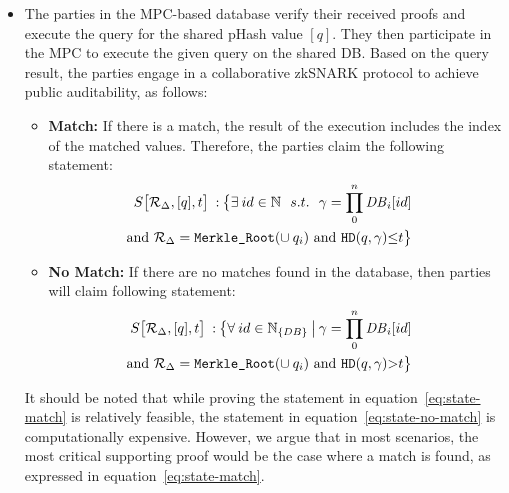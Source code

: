 {\begin{itemize}
    \item[]  The parties in the MPC-based database verify their received proofs and execute the query for the shared pHash value $[q]$. They then participate in the MPC to execute the given query on the shared DB. Based on the query result, the parties engage in a collaborative zkSNARK protocol to achieve public auditability, as follows:
    \begin{itemize}
        \item \textbf{Match:} If there is a match, the result of the execution includes the index of the matched values. Therefore, the parties claim the following statement:
        \begin{equation}\label{eq:state-match}
            \begin{split}
            \hspace{-0.5cm}S\bigr[\mathcal{R}_\Delta, [q] ,t\bigr] \: :\: \bigr\{ \exists \: id\in \mathbb{N}\:\:\: s.t. \:\:\: \gamma=\prod_0^n \mathit{DB}_i[id]\\
            \hspace{-0.5cm}\mbox{ and } \mathcal{R}_\Delta=\mbox{\texttt{Merkle\_Root}}(\cup \: q_i)\mbox{ and }  \mbox{\texttt{HD}}(q,\gamma) {\leq} t\bigr\}
            \end{split}
        \end{equation}
        \item \textbf{No Match:} If there are no matches found in the database, then parties will claim following statement:
        \begin{equation}\label{eq:state-no-match}
            \begin{split}
            \hspace{-0.5cm}S\bigr[\mathcal{R}_\Delta, [q] ,t\bigr] \: :\: \bigr\{ \forall \: id\in \mathbb{N}_{\{DB\}}\: \bigr|\: \gamma=\prod_0^n \mathit{DB}_i[id]\\
            \hspace{-0.5cm}\mbox{ and } \mathcal{R}_\Delta=\mbox{\texttt{Merkle\_Root}}(\cup \: q_i)\mbox{ and } \mbox{\texttt{HD}}(q,\gamma) {>} t \bigr\}
            \end{split}
        \end{equation}
    \end{itemize}
    It should be noted that while proving the statement in equation~\ref{eq:state-match} is relatively feasible, the statement in equation~\ref{eq:state-no-match} is computationally expensive. However, we argue that in most scenarios, the most critical supporting proof would be the case where a match is found, as expressed in equation~\ref{eq:state-match}.

\end{itemize}


}